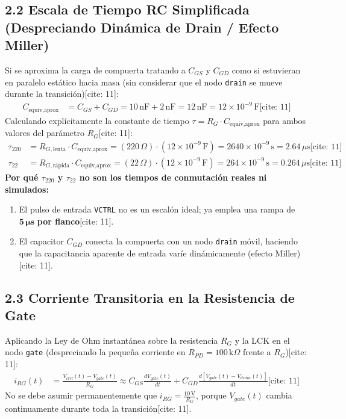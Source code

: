 \documentclass[11pt, a4paper]{article}
\begin{document}
\subsection*{2.2 Escala de Tiempo RC Simplificada (Despreciando Dinámica de Drain / Efecto Miller)}
Si se aproxima la carga de compuerta tratando a $C_{GS}$ y $C_{GD}$ como si estuvieran en paralelo estático hacia masa (sin considerar que el nodo \texttt{drain} se mueve durante la transición)[cite: 11]:
\begin{align}
    C_{\text{equiv,aprox}} &= C_{GS} + C_{GD} = 10\,\text{nF} + 2\,\text{nF} = 12\,\text{nF} = 12 \times 10^{-9}\,\text{F} \text{[cite: 11]}
\end{align}
Calculando explícitamente la constante de tiempo $\tau = R_G \cdot C_{\text{equiv,aprox}}$ para ambos valores del parámetro $R_G$[cite: 11]:
\begin{align}
    \tau_{220} &= R_{G,\text{lenta}} \cdot C_{\text{equiv,aprox}} = (220\,\Omega) \cdot (12 \times 10^{-9}\,\text{F}) = 2640 \times 10^{-9}\,\text{s} = 2.64\,\mu\text{s} \text{[cite: 11]} \\
    \tau_{22} &= R_{G,\text{rápida}} \cdot C_{\text{equiv,aprox}} = (22\,\Omega) \cdot (12 \times 10^{-9}\,\text{F}) = 264 \times 10^{-9}\,\text{s} = 0.264\,\mu\text{s} \text{[cite: 11]}
\end{align}
\textbf{Por qué $\tau_{220}$ y $\tau_{22}$ no son los tiempos de conmutación reales ni simulados:}
\begin{enumerate}[noitemsep]
    \item El pulso de entrada \texttt{VCTRL} no es un escalón ideal; ya emplea una rampa de $\mathbf{5\,\mu\text{s}}$ \textbf{por flanco}[cite: 11].
    \item El capacitor $C_{GD}$ conecta la compuerta con un nodo \texttt{drain} móvil, haciendo que la capacitancia aparente de entrada varíe dinámicamente (efecto Miller)[cite: 11].
\end{enumerate}

\subsection*{2.3 Corriente Transitoria en la Resistencia de Gate}
Aplicando la Ley de Ohm instantánea sobre la resistencia $R_G$ y la LCK en el nodo \texttt{gate} (despreciando la pequeña corriente en $R_{PD} = 100\,\text{k}\Omega$ frente a $R_G$)[cite: 11]:
\begin{align}
    i_{RG}(t) &= \frac{V_{ctrl}(t) - V_{gate}(t)}{R_G} \approx C_{GS}\frac{dV_{gate}(t)}{dt} + C_{GD}\frac{d\left[V_{gate}(t) - V_{drain}(t)\right]}{dt} \text{[cite: 11]}
\end{align}
No se debe asumir permanentemente que $i_{RG} = \frac{10\,\text{V}}{R_G}$, porque $V_{gate}(t)$ cambia continuamente durante toda la transición[cite: 11].
\end{document}
